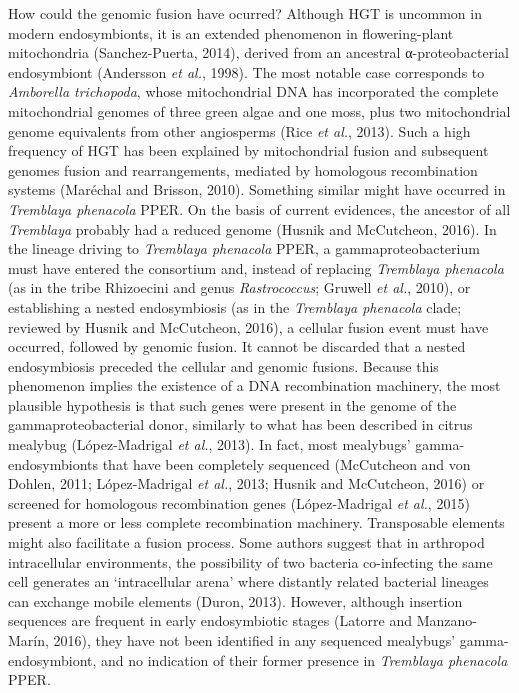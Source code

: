 \documentclass[11pt]{article}
\begin{document}
\begin{sloppypar}
\par
How could the genomic fusion have ocurred? 
Although HGT is uncommon in modern endosymbionts, it is an extended phenomenon in flowering-plant mitochondria (Sanchez-Puerta, 2014), derived from an ancestral α-proteobacterial endosymbiont
(Andersson \textit{et al.}, 1998). 
The most notable case corresponds to \textit{Amborella trichopoda}, whose mitochondrial DNA has incorporated the complete mitochondrial genomes of three green algae and one moss, plus two mitochondrial genome equivalents from other angiosperms (Rice \textit{et al.}, 2013). 
Such a high frequency of HGT has been explained by mitochondrial fusion and subsequent genomes fusion and rearrangements, mediated by homologous recombination systems (Maréchal and Brisson, 2010). 
Something similar might have occurred in \textit{Tremblaya phenacola} PPER. 
On the basis of current evidences, the ancestor of all \textit{Tremblaya} probably had a reduced genome (Husnik and McCutcheon, 2016). 
In the lineage driving to \textit{Tremblaya phenacola} PPER, a gammaproteobacterium must have entered the consortium and, instead of replacing \textit{Tremblaya phenacola} (as in the tribe Rhizoecini and genus \textit{Rastrococcus}; Gruwell \textit{et al.}, 2010), or establishing a nested endosymbiosis (as in the \textit{Tremblaya phenacola} clade; reviewed by Husnik and McCutcheon, 2016), a cellular fusion event must have occurred, followed by genomic fusion. 
It cannot be discarded that a nested endosymbiosis preceded the cellular and genomic fusions. 
Because this phenomenon implies the existence of a DNA recombination machinery, the most plausible hypothesis is that such genes were present in the genome of the gammaproteobacterial donor, similarly to what has been described in citrus mealybug (López-Madrigal \textit{et al.}, 2013). 
In fact, most mealybugs’ gamma-endosymbionts that have been completely sequenced (McCutcheon and von Dohlen, 2011; López-Madrigal \textit{et al.}, 2013; Husnik and McCutcheon, 2016) or screened for homologous recombination genes (López-Madrigal \textit{et al.}, 2015) present a more or less complete recombination machinery. 
Transposable elements might also facilitate a fusion process. 
Some authors suggest that in arthropod intracellular environments, the possibility of two bacteria co-infecting the same cell generates an ‘intracellular arena’ where distantly related bacterial lineages can exchange mobile elements (Duron, 2013). 
However, although insertion sequences are frequent in early endosymbiotic stages (Latorre and Manzano-Marín, 2016), they have not been identified in any sequenced mealybugs’ gamma-endosymbiont, and no indication of their former presence in \textit{Tremblaya phenacola} PPER. 

\end{sloppypar}
\end{document}
